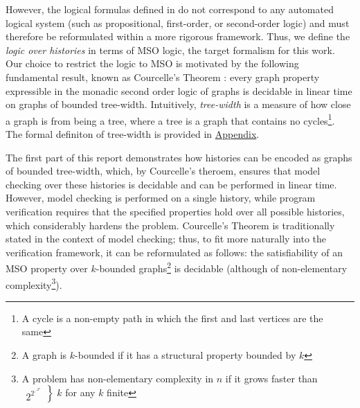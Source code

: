 \documentclass[12pt]{article}
\begin{document}
However, the logical formulas defined in  do not correspond to any automated logical system (such as propositional, first-order, or second-order logic) and must therefore be reformulated within a more rigorous framework. Thus, we define the \textsl{logic over histories} in terms of MSO logic, the target formalism for this work. Our choice to restrict the logic to MSO is motivated by the following fundamental result, known as Courcelle's Theorem : every graph property expressible in the monadic second order logic of graphs is decidable in linear time on graphs of bounded tree-width. Intuitively, \textsl{tree-width} is a measure of how close a graph is from being a tree, where a tree is a graph that contains no cycles\footnote{A cycle is a non-empty path in which the first and last vertices are the same}. The formal definiton of tree-width is provided in \hyperref[sec:appendix]{Appendix}.

The first part of this report demonstrates how histories can be encoded as graphs of bounded tree-width, which, by Courcelle's theroem, ensures that model checking over these histories is decidable and can be performed in linear time. However, model checking is performed on a single history, while program verification requires that the specified properties hold over all possible histories, which considerably hardens the problem. Courcelle's Theorem is traditionally stated in the context of model checking; thus, to fit more naturally into the verification framework, it can be reformulated as follows: the satisfiability of an MSO property over $k$-bounded graphs\footnote{A graph is $k$-bounded if it has a structural property bounded by $k$} is decidable (although of non-elementary complexity\footnote{A problem has non-elementary complexity in $n$ if it grows faster than
$\left.
\begin{array}{c}
2^{2^{\iddots^{2^n}}}
\end{array}
\right\} \; k
$ for any $k$ finite}).
\end{document}
